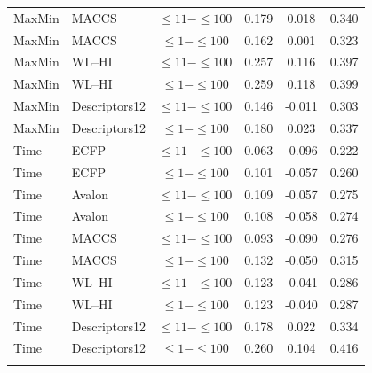 \begin{longtable}{llcccc}
MaxMin & MACCS & $\leq11-\leq100$ & 0.179 & 0.018 & 0.340 \\
MaxMin & MACCS & $\leq1-\leq100$ & 0.162 & 0.001 & 0.323 \\
MaxMin & WL--HI & $\leq11-\leq100$ & 0.257 & 0.116 & 0.397 \\
MaxMin & WL--HI & $\leq1-\leq100$ & 0.259 & 0.118 & 0.399 \\
MaxMin & Descriptors12 & $\leq11-\leq100$ & 0.146 & -0.011 & 0.303 \\
MaxMin & Descriptors12 & $\leq1-\leq100$ & 0.180 & 0.023 & 0.337 \\
\addlinespace
Time & ECFP & $\leq11-\leq100$ & 0.063 & -0.096 & 0.222 \\
Time & ECFP & $\leq1-\leq100$ & 0.101 & -0.057 & 0.260 \\
Time & Avalon & $\leq11-\leq100$ & 0.109 & -0.057 & 0.275 \\
Time & Avalon & $\leq1-\leq100$ & 0.108 & -0.058 & 0.274 \\
Time & MACCS & $\leq11-\leq100$ & 0.093 & -0.090 & 0.276 \\
Time & MACCS & $\leq1-\leq100$ & 0.132 & -0.050 & 0.315 \\
Time & WL--HI & $\leq11-\leq100$ & 0.123 & -0.041 & 0.286 \\
Time & WL--HI & $\leq1-\leq100$ & 0.123 & -0.040 & 0.287 \\
Time & Descriptors12 & $\leq11-\leq100$ & 0.178 & 0.022 & 0.334 \\
Time & Descriptors12 & $\leq1-\leq100$ & 0.260 & 0.104 & 0.416 \\
\addlinespace
\end{longtable}

